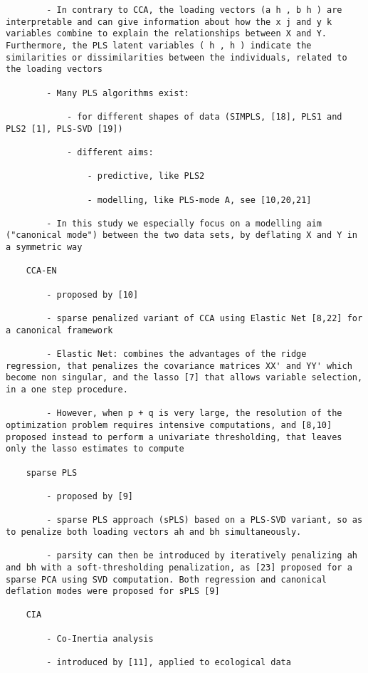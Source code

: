 \documentclass[
]{book}
\begin{document}
\begin{verbatim}
        - In contrary to CCA, the loading vectors (a h , b h ) are interpretable and can give information about how the x j and y k variables combine to explain the relationships between X and Y. Furthermore, the PLS latent variables ( h , h ) indicate the similarities or dissimilarities between the individuals, related to the loading vectors

        - Many PLS algorithms exist:

            - for different shapes of data (SIMPLS, [18], PLS1 and PLS2 [1], PLS-SVD [19])

            - different aims:

                - predictive, like PLS2

                - modelling, like PLS-mode A, see [10,20,21]

        - In this study we especially focus on a modelling aim ("canonical mode") between the two data sets, by deflating X and Y in a symmetric way

    CCA-EN

        - proposed by [10]

        - sparse penalized variant of CCA using Elastic Net [8,22] for a canonical framework

        - Elastic Net: combines the advantages of the ridge regression, that penalizes the covariance matrices XX' and YY' which become non singular, and the lasso [7] that allows variable selection, in a one step procedure.

        - However, when p + q is very large, the resolution of the optimization problem requires intensive computations, and [8,10] proposed instead to perform a univariate thresholding, that leaves only the lasso estimates to compute

    sparse PLS

        - proposed by [9]

        - sparse PLS approach (sPLS) based on a PLS-SVD variant, so as to penalize both loading vectors ah and bh simultaneously.

        - parsity can then be introduced by iteratively penalizing ah and bh with a soft-thresholding penalization, as [23] proposed for a sparse PCA using SVD computation. Both regression and canonical deflation modes were proposed for sPLS [9]

    CIA

        - Co-Inertia analysis

        - introduced by [11], applied to ecological data


\end{verbatim}
\end{document}
